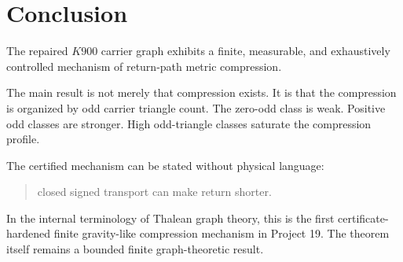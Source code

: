 \section{Conclusion}

The repaired \(K900\) carrier graph exhibits a finite, measurable, and exhaustively controlled mechanism of return-path metric compression.

The main result is not merely that compression exists. It is that the compression is organized by odd carrier triangle count. The zero-odd class is weak. Positive odd classes are stronger. High odd-triangle classes saturate the compression profile.

The certified mechanism can be stated without physical language:

\begin{quote}
closed signed transport can make return shorter.
\end{quote}

In the internal terminology of Thalean graph theory, this is the first certificate-hardened finite gravity-like compression mechanism in Project 19. The theorem itself remains a bounded finite graph-theoretic result.
